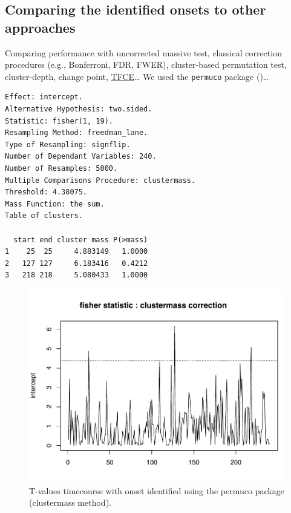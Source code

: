 \documentclass[
  doc,
  floatsintext,
  longtable,
  a4paper,
  nolmodern,
  notxfonts,
  notimes,
  colorlinks=true,linkcolor=blue,citecolor=blue,urlcolor=blue]{apa7}
\begin{document}
\subsection{Comparing the identified onsets to other
approaches}\label{comparing-the-identified-onsets-to-other-approaches}

Comparing performance with uncorrected massive test, classical
correction procedures (e.g., Bonferroni, FDR, FWER), cluster-based
permutation test, cluster-depth, change point,
\href{https://jaromilfrossard.github.io/permuco4brain/articles/tfce.html}{TFCE}\ldots{}
We used the \texttt{permuco} package
()\ldots{}

\begin{verbatim}
Effect: intercept.
Alternative Hypothesis: two.sided.
Statistic: fisher(1, 19).
Resampling Method: freedman_lane.
Type of Resampling: signflip.
Number of Dependant Variables: 240.
Number of Resamples: 5000.
Multiple Comparisons Procedure: clustermass.
Threshold: 4.38075.
Mass Function: the sum.
Table of clusters.

  start end cluster mass P(>mass)
1    25  25     4.883149   1.0000
2   127 127     6.183416   0.4212
3   218 218     5.080433   1.0000
\end{verbatim}

\begin{figure}[H]

\caption{T-values timecourse with onset identified using the permuco
package (clustermass method).}

{\centering \includegraphics[width=1\textwidth,height=\textheight]{brms_meeg_files/figure-pdf/permutations-1d-1.pdf}

}

\end{figure}%
\end{document}
